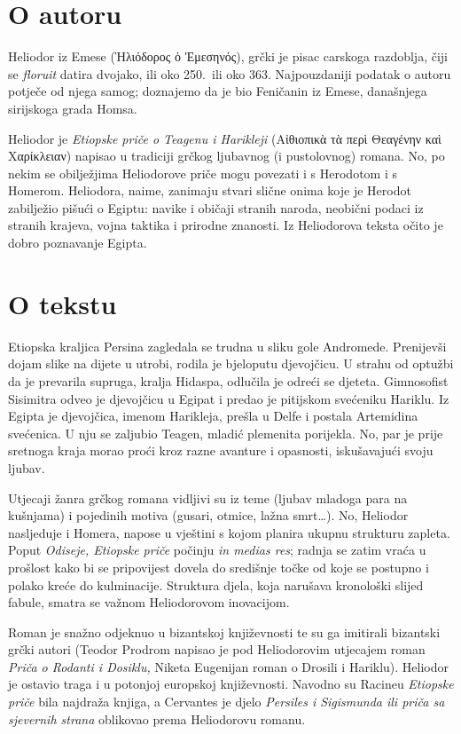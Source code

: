 \section*{O autoru}

Heliodor iz Emese \textgreek[variant=ancient]{(Ἡλιόδορος ὁ Ἐμεσηνός),} grčki je pisac carskoga razdoblja, čiji se \textit{floruit} datira dvojako, ili oko 250.\ ili oko 363. Najpouzdaniji podatak o autoru potječe od njega samog; doznajemo da je bio Feničanin iz Emese, današnjega sirijskoga grada Homsa.

Heliodor je \textit{Etiopske priče o Teagenu i Harikleji} \textgreek[variant=ancient]{(Αἰθιοπικὰ τὰ περὶ Θεαγένην καὶ Χαρίκλειαν)} napisao u tradiciji grčkog ljubavnog (i pustolovnog) romana. No, po nekim se obilježjima Heliodorove priče mogu povezati i s Herodotom i s Homerom. Heliodora, naime, zanimaju stvari slične onima koje je Herodot zabilježio pišući o Egiptu: navike i običaji stranih naroda, neobični podaci iz stranih krajeva, vojna taktika i prirodne znanosti. Iz Heliodorova teksta očito je dobro poznavanje Egipta.


\section*{O tekstu}

Etiopska kraljica Persina zagledala se trudna u sliku gole Andromede. Prenijevši dojam slike na dijete u utrobi, rodila je bjeloputu djevojčicu. U strahu od optužbi da je prevarila supruga, kralja Hidaspa, odlučila je odreći se djeteta. Gimnosofist Sisimitra odveo je djevojčicu u Egipat i predao je pitijskom svećeniku Hariklu. Iz Egipta je djevojčica, imenom Harikleja, prešla u Delfe i postala Artemidina svećenica. U nju se zaljubio Teagen, mladić plemenita porijekla. No, par je prije sretnoga kraja morao proći kroz razne avanture i opasnosti, iskušavajući svoju ljubav.

Utjecaji žanra grčkog romana vidljivi su iz teme (ljubav mladoga para na kušnjama) i pojedinih motiva (gusari, otmice, lažna smrt\dots). No, Heliodor nasljeduje i Homera, napose u vještini s kojom planira ukupnu strukturu zapleta. Poput \textit{Odiseje, Etiopske priče} počinju \textit{in medias res}; radnja se zatim vraća u prošlost kako bi se pripovijest dovela do središnje točke od koje se postupno i polako kreće do kulminacije. Struktura djela, koja narušava kronološki slijed fabule, smatra se važnom Heliodorovom inovacijom. 

Roman je snažno odjeknuo u bizantskoj književnosti te su ga imitirali bizantski grčki autori (Teodor Prodrom napisao je pod Heliodorovim utjecajem roman \textit{Priča o Rodanti i Dosiklu,} Niketa Eugenijan roman o Drosili i Hariklu). Heliodor je ostavio traga i u potonjoj europskoj književnosti. Navodno su Racineu \textit{Etiopske priče} bila najdraža knjiga, a Cervantes je djelo \textit{Persiles i Sigismunda ili priča sa sjevernih strana} oblikovao prema Heliodorovu romanu.

